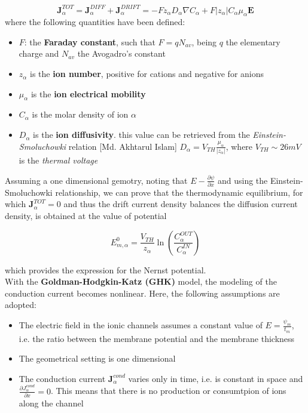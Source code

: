 \documentclass[a4paper]{article}
\begin{document}
\begin{equation}
	\textbf{J}_{\alpha}^{TOT} = \textbf{J}_{\alpha}^{DIFF} + \textbf{J}_{\alpha}^{DRIFT} = -Fz_{\alpha}D_{\alpha}\nabla C_{\alpha} + F|z_{\alpha}| C_{\alpha}\mu_{\alpha}\textbf{E}
\end{equation}
where the following quantities have been defined:
\begin{itemize}
	
	\item $F$: the \textbf{Faraday constant}, such that $F = q N_{av}$, being $q$ the elementary charge and $N_{av}$ the Avogadro's constant
	
	\item $z_{\alpha}$ is the \textbf{ion number}, positive for cations and negative for anions
	
	\item $\mu_{\alpha}$ is the \textbf{ion electrical mobility}
	
	\item $C_{\alpha}$ is the molar density of ion $\alpha$
	
	\item $D_{\alpha}$ is the \textbf{ion diffusivity}. this value can be retrieved from the \textit{Einstein-Smoluchowki} relation [Md. Akhtarul Islam] $D_{\alpha} = V_{TH}\frac{\mu_{\alpha}}{|z_{\alpha}|}$, where $ V_{TH} \sim 26 mV$ is the \textit{thermal voltage}
\end{itemize}

Assuming a one dimensional gemotry, noting that $ E -\frac{\partial \psi}{\partial x}$ and using the Einstein-Smoluchowki relationship, we can prove that the thermodynamic equilibrium, for which $\textbf{J}_{\alpha}^{TOT} = 0$ and thus the drift current density balances the diffusion current density, is obtained at the value of potential

\begin{equation}
	E_{m,\alpha}^0 = \frac{V_{TH}}{z_{\alpha}}\ln\left(\frac{C_{\alpha}^{OUT}}{C_{\alpha}^{IN}}\right)
\end{equation}

which provides the expression for the Nernst potential.
\\

With the \textbf{Goldman-Hodgkin-Katz (GHK)} model, the modeling of the conduction current becomes nonlinear. Here, the following assumptions are adopted: 

\begin{itemize}
	
	\item The electric field in the ionic channels assumes a constant value of $ E = \frac{\psi_m}{t_m}$, i.e. the ratio between the membrane potential and the membrane thickness
	
	\item The geometrical setting is one dimensional
	
	\item The conduction current $\textbf{J}_{\alpha}^{cond}$ varies only in time, i.e. is constant in space and $ \frac{\partial J_{\alpha}^{cond} }{\partial x} = 0$. This means that there is no production or consumtpion of ions along the channel
	
\end{itemize}
\end{document}
